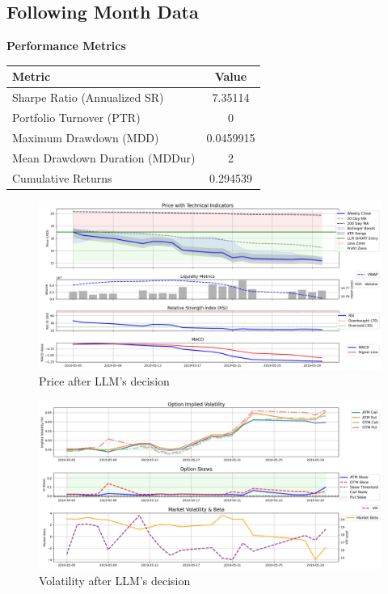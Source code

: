 \documentclass[8pt]{scrartcl}
\begin{document}
\subsection*{Following Month Data}

\textbf{Performance Metrics}

\begin{longtable}{l c}
\toprule
\textbf{Metric} & \textbf{Value} \\
\midrule
Sharpe Ratio (Annualized SR) & 7.35114 \\
Portfolio Turnover (PTR) & 0 \\
Maximum Drawdown (MDD) & 0.0459915 \\
Mean Drawdown Duration (MDDur) & 2 \\
Cumulative Returns & 0.294539 \\
\bottomrule
\end{longtable}

\begin{figure}[H]
    \centering
    \includegraphics[width=1\linewidth]{judge_reviews//TSLA_M_gpt-4o-mini//2019-05-01/llm_Price_with_Technical_Indicators.png}
    \caption{Price after LLM's decision}
\end{figure}

\begin{figure}[H]
    \centering
    \includegraphics[width=1\linewidth]{judge_reviews/TSLA_M_gpt-4o-mini/2019-05-01/llm_Market_Volatility_&_Beta.png}
    \caption{Volatility after LLM's decision}
\end{figure}
\end{document}
